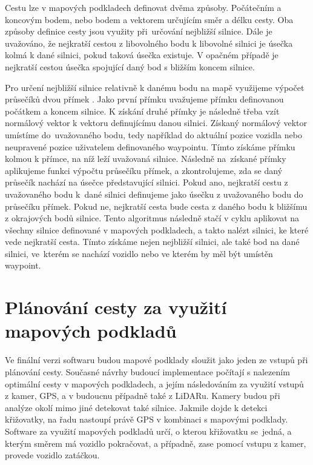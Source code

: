 \documentclass[czech, bachelor]{diploma}
\begin{document}
Cestu lze v mapových podkladech definovat dvěma způsoby. Počátečním a koncovým bodem, nebo bodem a vektorem určujícím směr a délku
cesty. Oba způsoby definice cesty jsou využity při~určování nejbližší silnice. Dále je uvažováno, že nejkratší cestou
z libovolného bodu k libovolné silnici je úsečka kolmá k dané silnici, pokud taková úsečka existuje. V opačném případě
je nejkratší cestou úsečka spojující daný bod s bližším koncem silnice.

Pro určení nejbližší silnice relativně k danému bodu na mapě využijeme výpočet průsečíků dvou přímek
\cite{line-line-intersection-source}.  Jako první přímku uvažujeme přímku definovanou počátkem a koncem silnice. K získání druhé
přímky je následně třeba vzít normálový vektor k vektoru definujícímu danou silnici. Získaný normálový vektor umístíme
do~uvažovaného bodu, tedy například do aktuální pozice vozidla nebo neupravené pozice uživatelem definovaného waypointu. Tímto
získáme přímku kolmou k přímce, na níž leží uvažovaná silnice. Následně na~získané přímky aplikujeme funkci výpočtu průsečíku
přímek, a zkontrolujeme, zda se daný průsečík nachází na úsečce představující silnici. Pokud ano, nejkratší cestu z uvažovaného
bodu k~dané silnici definujeme jako úsečku z uvažovaného bodu do průsečíku přímek. Pokud ne, nejkratší cesta bude cesta z daného
bodu k bližšímu z okrajových bodů silnice. Tento algoritmus následně stačí v cyklu aplikovat na všechny silnice definované
v mapových podkladech, a takto nalézt silnici, ke které vede nejkratší cesta. Tímto získáme nejen nejbližší silnici, ale také bod
na dané silnici, ve~kterém se nachází vozidlo nebo ve kterém by měl být umístěn waypoint.

\section{Plánování cesty za využití mapových podkladů}

Ve finální verzi softwaru budou mapové podklady sloužit jako jeden ze vstupů při plánování cesty. Současné návrhy budoucí
implementace počítají s nalezením optimální cesty v mapových podkladech, a jejím následováním za využití vstupů z kamer, GPS, 
a v budoucnu případně také z LiDARu. Kamery budou při analýze okolí mimo jiné detekovat také silnice. Jakmile dojde k detekci
křižovatky, na řadu nastoupí právě GPS v kombinaci s mapovými podklady. Software za využití mapových podkladů určí, o kterou
křižovatku se~jedná, a kterým směrem má vozidlo pokračovat, a případně, zase pomocí vstupu z kamer, provede vozidlo zatáčkou.
\end{document}
